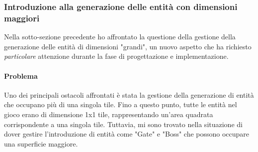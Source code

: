 \documentclass[a4paper,12pt]{report}
\begin{document}
\subsubsection*{Introduzione alla generazione delle entità con dimensioni maggiori}
Nella sotto-sezione precedente ho affrontato la questione della gestione della generazione delle entità di dimensioni "grandi", un nuovo aspetto che ha richiesto \textit{particolare} attenzione durante la fase di progettazione e implementazione.
\paragraph*{Problema}
Uno dei principali ostacoli affrontati è stata la gestione della generazione di entità che occupano più di una singola tile. 
Fino a questo punto, tutte le entità nel gioco erano di dimensione 1x1 tile, rappresentando un'area quadrata corrispondente a una singola tile. 
Tuttavia, mi sono trovato nella situazione di dover gestire l'introduzione di entità come "Gate" e "Boss" che possono occupare una superficie maggiore.
\end{document}
